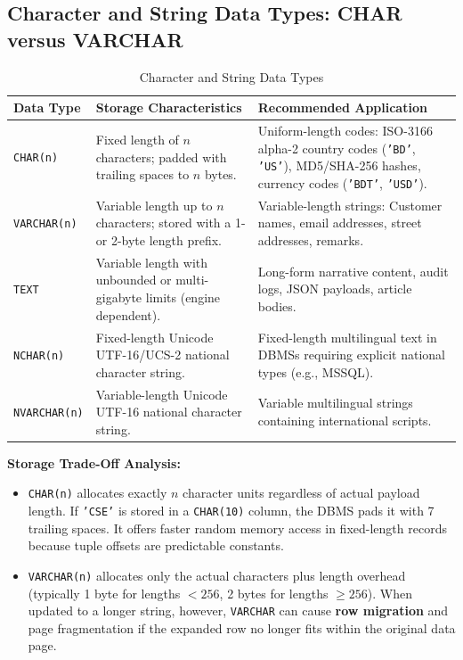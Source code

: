 \subsection{Character and String Data Types: CHAR versus VARCHAR}
\begin{table}[htbp]
\centering
\small
\caption{Character and String Data Types}
\label{tab:sql_string_types}
\begin{tabularx}{\textwidth}{l p{3.5cm} X}
\toprule
\textbf{Data Type} & \textbf{Storage Characteristics} & \textbf{Recommended Application} \\
\midrule
\texttt{CHAR(n)} & Fixed length of $n$ characters; padded with trailing spaces to $n$ bytes. & Uniform-length codes: ISO-3166 alpha-2 country codes (\texttt{'BD'}, \texttt{'US'}), MD5/SHA-256 hashes, currency codes (\texttt{'BDT'}, \texttt{'USD'}). \\
\texttt{VARCHAR(n)} & Variable length up to $n$ characters; stored with a 1- or 2-byte length prefix. & Variable-length strings: Customer names, email addresses, street addresses, remarks. \\
\texttt{TEXT} & Variable length with unbounded or multi-gigabyte limits (engine dependent). & Long-form narrative content, audit logs, JSON payloads, article bodies. \\
\texttt{NCHAR(n)} & Fixed-length Unicode UTF-16/UCS-2 national character string. & Fixed-length multilingual text in DBMSs requiring explicit national types (e.g., MSSQL). \\
\texttt{NVARCHAR(n)} & Variable-length Unicode UTF-16 national character string. & Variable multilingual strings containing international scripts. \\
\bottomrule
\end{tabularx}
\end{table}

\textbf{Storage Trade-Off Analysis:}
\begin{itemize}
    \item \texttt{CHAR(n)} allocates exactly $n$ character units regardless of actual payload length. If \texttt{'CSE'} is stored in a \texttt{CHAR(10)} column, the DBMS pads it with 7 trailing spaces. It offers faster random memory access in fixed-length records because tuple offsets are predictable constants.
    \item \texttt{VARCHAR(n)} allocates only the actual characters plus length overhead (typically 1 byte for lengths $< 256$, 2 bytes for lengths $\ge 256$). When updated to a longer string, however, \texttt{VARCHAR} can cause \textbf{row migration} and page fragmentation if the expanded row no longer fits within the original data page.
\end{itemize}

